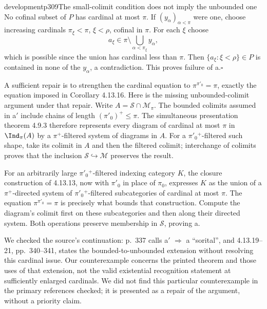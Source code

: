 \begin{dcomment}{development}{p309}{The small-colimit condition does not imply the unbounded one}
No cofinal subset of $P$ has cardinal at most $\pi$. If $(y_\alpha)_{\alpha<\pi}$ were one, choose increasing cardinals $\pi_\xi<\pi$, $\xi<\rho$, cofinal in $\pi$. For each $\xi$ choose
\[
 a_\xi\in\pi\setminus\bigcup_{\alpha<\pi_\xi}y_\alpha,
\]
which is possible since the union has cardinal less than $\pi$. Then $\{a_\xi:\xi<\rho\}\in P$ is contained in none of the $y_\alpha$, a contradiction. This proves failure of a.\hfill$\square$

A sufficient repair is to strengthen the cardinal equation to $\pi^{\pi'_0}=\pi$, exactly the equation imposed in Corollary 4.13.16. Here is the missing unbounded-colimit argument under that repair. Write $A=\mathcal S\cap\mathcal M_\pi$. The bounded colimits assumed in a$'$ include chains of length $(\pi'_0)^+\leq\pi$. The simultaneous presentation theorem 4.9.3 therefore represents every diagram of cardinal at most $\pi$ in $\Ind_\pi(A)$ by a $\pi^+$-filtered system of diagrams in $A$. For a $\pi'_0{}^+$-filtered such shape, take its colimit in $A$ and then the filtered colimit; interchange of colimits proves that the inclusion $\mathcal S\hookrightarrow\mathcal M$ preserves the result.

For an arbitrarily large $\pi'_0{}^+$-filtered indexing category $K$, the closure construction of 4.13.13, now with $\pi'_0$ in place of $\pi_0$, expresses $K$ as the union of a $\pi^+$-directed system of $\pi'_0{}^+$-filtered subcategories of cardinal at most $\pi$. The equation $\pi^{\pi'_0}=\pi$ is precisely what bounds that construction. Compute the diagram's colimit first on these subcategories and then along their directed system. Both operations preserve membership in $\mathcal S$, proving a.

We checked the source's continuation: p.~337 calls a$'$ $\Rightarrow$ a ``sorital'', and 4.13.19--21, pp.~340--341, states the bounded-to-unbounded extension without resolving this cardinal issue. Our counterexample concerns the printed theorem and those uses of that extension, not the valid existential recognition statement at sufficiently enlarged cardinals. We did not find this particular counterexample in the primary references checked; it is presented as a repair of the argument, without a priority claim.
\end{dcomment}

